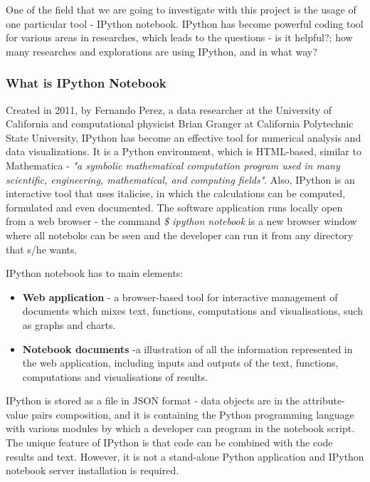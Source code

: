 
One of the field that we are going to investigate with this project is the usage of one particular tool - IPython notebook. IPython has become powerful coding tool for various areas in researches, which leads to the questions - is it helpful?; how many researches and explorations are using IPython, and in what way? 

\subsubsection{What is IPython Notebook}
\label{definition}

Created in 2011, by Fernando Perez, a data researcher at the University of California and computational physicist Brian Granger at California Polytechnic State University, IPython has become an effective tool for numerical analysis and data visualizations.\cite{shen2014interactive} It is a Python environment, which is HTML-based, similar to Mathematica - \textit{"a symbolic mathematical computation program used in many scientific, engineering, mathematical, and computing fields"}. \cite{mathematicaWiki} \cite{mathematicaWolfram} Also, IPython is an interactive tool that uses italicise, in which the calculations can be computed, formulated and even documented. The software application runs locally open from a web browser - the command \textit{\$ ipython notebook} is a new browser window where all noteboks can be seen and the developer can run it from any directory that s/he wants.  \cite{johansson2014introduction}

IPython notebook has to main elements:\cite{ipythonFeatures}

\begin{itemize}
\item \textbf{Web application} - a browser-based tool for interactive management of documents which mixes text, functions, computations and visualisations, such as graphs and charts. 
\item \textbf{Notebook documents} -a illustration of all the information represented in the web application, including inputs and outputs of the text, functions, computations and visualisations of results.
\end{itemize}

IPython is stored as a file in JSON format - data objects are in the attribute-value pairs composition, and it is containing the Python programming language with various modules by which a developer can program in the notebook script. The unique feature of IPython is that code can be combined with the code results and text. However, it is not a stand-alone Python application and IPython notebook server installation is required.

